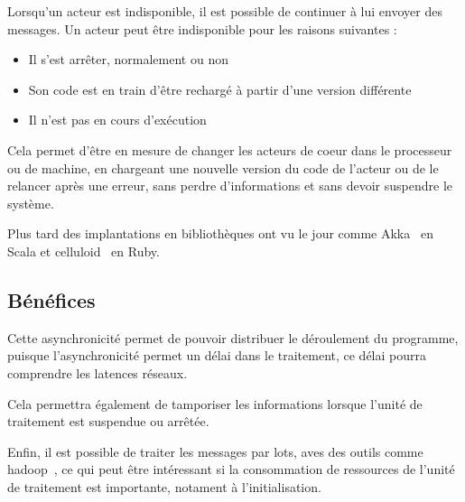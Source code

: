 \documentclass{article}
\begin{document}
Lorsqu'un acteur est indisponible, il est possible de continuer à lui envoyer
des messages.
Un acteur peut être indisponible pour les raisons suivantes :
\begin{itemize}
    \item Il s'est arrêter, normalement ou non
    \item Son code est en train d'être rechargé à partir d'une version différente
    \item Il n'est pas en cours d'exécution
\end{itemize}

Cela permet d'être en mesure de changer les acteurs de coeur dans le processeur ou
de machine, en chargeant une nouvelle version du code de l'acteur ou de le relancer
après une erreur, sans perdre d'informations et sans devoir suspendre le système.

Plus tard des implantations en bibliothèques ont vu le jour comme Akka~\cite{akka}
en Scala et celluloid~\cite{celluloid} en Ruby.

\subsection{Bénéfices}\label{bénéfices}
Cette asynchronicité permet de pouvoir distribuer le déroulement du programme,
puisque l'asynchronicité permet un délai dans le traitement, ce délai pourra comprendre
les latences réseaux.

Cela permettra également de tamporiser les informations lorsque l'unité de
traitement est suspendue ou arrêtée.

Enfin, il est possible de traiter les messages par lots, aves des outils comme hadoop~\cite{hadoop},
ce qui peut être intéressant si la consommation de ressources de l'unité de traitement
est importante, notament à l'initialisation.
\end{document}
